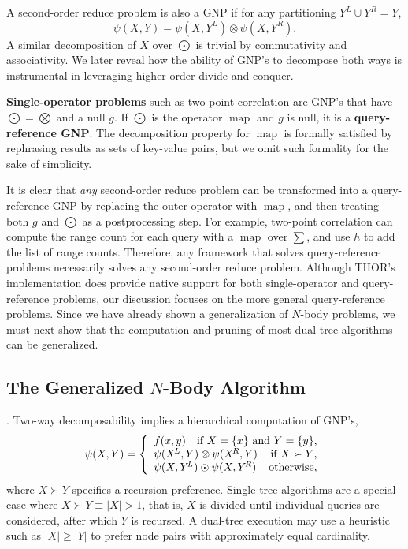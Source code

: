 \documentclass[twoside,leqno,twocolumn]{article}
\newcommand{\union}{\cup}
\newcommand{\prefsplit}[2]{#1 \succ #2}
\DeclareMathOperator*{\map}{map}
\newcommand{\gnp}{\psi}
\newcommand{\mysub}[1]{\subsection{#1}. }
\newcommand{\defterm}[1]{{\bf #1}}
\newcommand{\kdleft}[1]{#1^{\!L}}
\newcommand{\kdright}[1]{#1^{\!R}}
\begin{document}
A second-order reduce problem is also a GNP if for any partitioning $\kdleft{Y} \union \kdright{Y} = Y$,
\[\gnp(X,Y) = \gnp(X,\kdleft{Y}) \otimes \gnp(X,\kdright{Y}).\]
\noindent A similar decomposition of $X$ over $\bigodot$ is trivial by commutativity and associativity.
We later reveal how the ability of GNP's to decompose both ways is instrumental in leveraging higher-order divide and conquer.

\defterm{Single-operator problems} such as two-point correlation are GNP's that have $\bigodot = \bigotimes$ and a null $g$.
If $\bigodot$ is the operator $\map$ and $g$ is null, it is a \defterm{query-reference GNP}.
The decomposition property for $\map$ is formally satisfied by rephrasing results as sets of key-value pairs, but we omit such formality for the sake of simplicity.

It is clear that {\em any} second-order reduce problem can be transformed into a query-reference GNP by replacing the outer operator with $\map$, and then treating both $g$ and $\bigodot$ as a postprocessing step.
For example, two-point correlation can compute the range count for each query with a $\map$ over $\sum$, and use $h$ to add the list of range counts.
Therefore, any framework that solves query-reference problems necessarily solves any second-order reduce problem.
Although THOR's implementation does provide native support for both single-operator and query-reference problems, our discussion focuses on the more general query-reference problems.
Since we have already shown a generalization of $N$-body problems, we must next show that the computation and pruning of most dual-tree algorithms can be generalized.

\mysub{The Generalized $N$-Body Algorithm}
Two-way decomposability implies a hierarchical computation of GNP's,
\[
\gnp(X,Y) = \left\{ \begin{array}{lrr}
    f(x,y) & \multicolumn{2}{r}{\text{if }X = \{x\}\text{ and }Y = \{y\}\text{,}}
    \\
    \multicolumn{2}{l}{\gnp(\kdleft{X},Y) \otimes \gnp(\kdright{X}, Y)} & \text{if }\prefsplit{X}{Y}\text{,}
    \\
    \multicolumn{2}{l}{\gnp(X,\kdleft{Y}) \odot \gnp(X,\kdright{Y})} & \text{otherwise,}
  \end{array}
\right.
\]
\noindent
where $\prefsplit{X}{Y}$ specifies a recursion preference.
Single-tree algorithms are a special case where $\prefsplit{X}{Y} \equiv |X| > 1$, that is, $X$ is divided until individual queries are considered, after which $Y$ is recursed.
A dual-tree execution may use a heuristic such as $|X| \geq |Y|$ to prefer node pairs with approximately equal cardinality.
\end{document}
